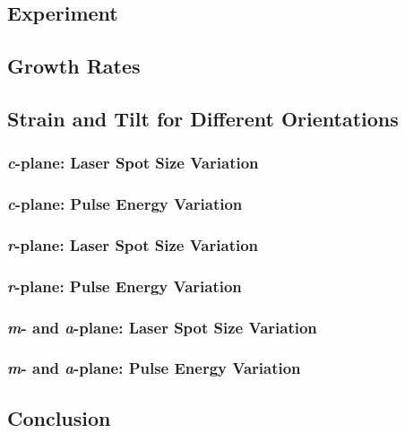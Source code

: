 \subsection{Experiment}
    
    \label{Sec:Results_3_Experiment}
\subsection{Growth Rates}
    
    \subsection{Strain and Tilt for Different Orientations}
        \subsubsection*{\textit{c}-plane: Laser Spot Size Variation}
            
        \subsubsection*{\textit{c}-plane: Pulse Energy Variation}
            
        \subsubsection*{\textit{r}-plane: Laser Spot Size Variation}
            
        \subsubsection*{\textit{r}-plane: Pulse Energy Variation}
            
        \subsubsection*{\textit{m}- and \textit{a}-plane: Laser Spot Size Variation}
            
        \subsubsection*{\textit{m}- and \textit{a}-plane: Pulse Energy Variation}
            
\subsection{Conclusion}
    